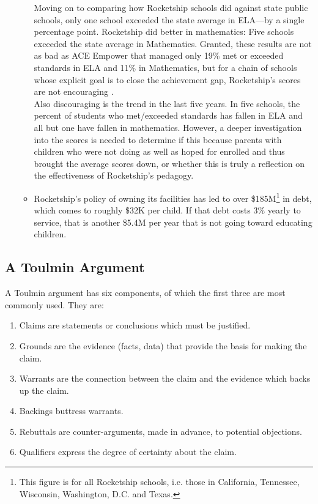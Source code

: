 \begin{enumerate}[topsep=0.3\baselineskip,itemsep=0.25\baselineskip,resume]
\begin{itemize}[topsep=0.125\baselineskip,itemsep=0.25\baselineskip]
      Moving on to comparing how Rocketship schools did against state public schools, only one school exceeded the state average in ELA—by a single percentage point. Rocketship did better in mathematics: Five schools exceeded the state average in Mathematics. Granted, these results are not as bad as ACE Empower that managed only 19\% met or exceeded standards in ELA and 11\% in Mathematics, but for a chain of schools whose explicit goal is to close the achievement gap, Rocketship's scores are not encouraging \parencite{SCCOE2014}.\\
      Also discouraging is the trend in the last five years. In five schools, the percent of students who met/exceeded standards has fallen in ELA and all but one have fallen in mathematics. However, a deeper investigation into the scores is needed to determine if this because parents with children who were not doing as well as hoped for enrolled and thus brought the average scores down, or whether this is truly a reflection on the effectiveness of Rocketship's pedagogy.
      \item Rocketship's policy of owning its facilities has led to over \$185M\footnote{This figure is for all Rocketship schools, i.e. those in  California, Tennessee, Wisconsin, Washington, D.C. and Texas.} in debt, which comes to roughly \$32K per child. If that debt costs 3\% yearly to service, that is another \$5.4M per year that is not going toward educating children.
    \end{itemize}
\end{enumerate}

\subsection{A Toulmin Argument}%
\label{sec:toulmin-arguments}\indent%

A Toulmin argument has six components, of which the first three are most commonly used. They are:

\begin{enumerate}[topsep=0.3\baselineskip,itemsep=0.25\baselineskip]
  \item Claims are statements or conclusions which must be justified.
  \item Grounds are the evidence (facts, data) that provide the basis for making the claim.
  \item Warrants are the connection between the claim and the evidence which backs up the claim.
  \item Backings buttress warrants.
  \item Rebuttals are counter-arguments, made in advance, to potential objections.
  \item Qualifiers express the degree of certainty about the claim.
\end{enumerate}

